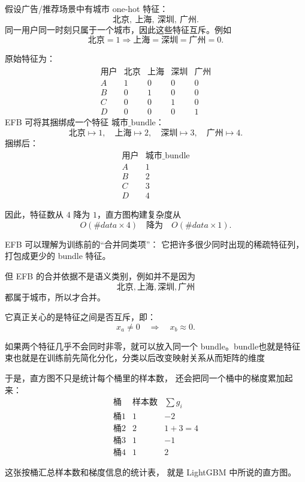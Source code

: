 \begin{example}
假设广告/推荐场景中有城市 one-hot 特征：
\[
\text{北京},\ \text{上海},\ \text{深圳},\ \text{广州}.
\]
同一用户同一时刻只属于一个城市，因此这些特征互斥。例如
\[
\text{北京}=1 \Rightarrow \text{上海}=\text{深圳}=\text{广州}=0.
\]

原始特征为：
\[
\begin{array}{c|cccc}
\text{用户} & \text{北京} & \text{上海} & \text{深圳} & \text{广州} \\
\hline
A & 1 & 0 & 0 & 0 \\
B & 0 & 1 & 0 & 0 \\
C & 0 & 0 & 1 & 0 \\
D & 0 & 0 & 0 & 1
\end{array}
\]
EFB 可将其捆绑成一个特征 $\text{城市\_bundle}$：
\[
\text{北京}\mapsto 1,\quad
\text{上海}\mapsto 2,\quad
\text{深圳}\mapsto 3,\quad
\text{广州}\mapsto 4.
\]
捆绑后：
\[
\begin{array}{c|c}
\text{用户} & \text{城市\_bundle} \\
\hline
A & 1 \\
B & 2 \\
C & 3 \\
D & 4
\end{array}
\]

因此，特征数从 $4$ 降为 $1$，直方图构建复杂度从
\[
O(\#data \times 4)
\quad \text{降为} \quad
O(\#data \times 1).
\]
\end{example}
\begin{dxtips}[不是一类合并成一类而是只要互斥就可以放在一类]
EFB 可以理解为训练前的“合并同类项”：
它把许多很少同时出现的稀疏特征列，打包成更少的 bundle 特征。

但 EFB 的合并依据不是语义类别，例如并不是因为
\[
\text{北京},\text{上海},\text{深圳},\text{广州}
\]
都属于城市，所以才合并。

它真正关心的是特征之间是否互斥，即：
\[
x_a \neq 0 \quad \Rightarrow \quad x_b \approx 0.
\]

如果两个特征几乎不会同时非零，就可以放入同一个 bundle。bundle也就是特征束也就是在训练前先简化分化，分类以后改变映射关系从而矩阵的维度
\end{dxtips}
\begin{note}
    于是，直方图不只是统计每个桶里的样本数，
还会把同一个桶中的梯度累加起来：
\[
\begin{array}{c|c|c}
\text{桶} & \text{样本数} & \sum g_i \\
\hline
\text{桶1} & 1 & -2 \\
\text{桶2} & 2 & 1+3=4 \\
\text{桶3} & 1 & -1 \\
\text{桶4} & 1 & 2
\end{array}
\]

这张按桶汇总样本数和梯度信息的统计表，
就是 LightGBM 中所说的直方图。
\end{note}

